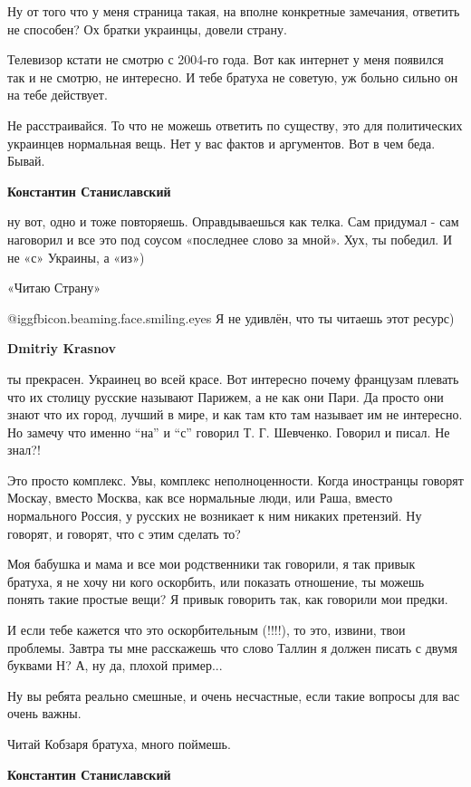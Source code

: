 \begin{itemize}
\begin{itemize}
Ну от того что у меня страница такая, на вполне конкретные замечания, ответить
не способен? Ох братки украинцы, довели страну.

Телевизор кстати не смотрю с 2004-го года. Вот как интернет у меня появился так
и не смотрю, не интересно. И тебе братуха не советую, уж больно сильно он на
тебе действует.

Не расстраивайся. То что не можешь ответить по существу, это для политических
украинцев нормальная вещь. Нет у вас фактов и аргументов. Вот в чем беда.
Бывай.

\textbf{Константин Станиславский} 

ну вот, одно и тоже повторяешь. Оправдываешься как телка. Сам придумал - сам
наговорил и все это под соусом «последнее слово за мной». Хух, ты победил. И не
«с» Украины, а «из»)

«Читаю Страну»

 @igg{fbicon.beaming.face.smiling.eyes} Я не удивлён, что ты читаешь этот ресурс)


\textbf{Dmitriy Krasnov} 

ты прекрасен. Украинец во всей красе. Вот интересно почему французам плевать
что их столицу русские называют Парижем, а не как они Пари. Да просто они знают
что их город, лучший в мире, и как там кто там называет им не интересно. Но
замечу что именно \enquote{на} и \enquote{с} говорил Т. Г. Шевченко. Говорил и писал. Не знал?!

Это просто комплекс. Увы, комплекс неполноценности. Когда иностранцы говорят
Москау, вместо Москва, как все нормальные люди, или Раша, вместо нормального
Россия, у русских не возникает к ним никаких претензий. Ну говорят, и говорят,
что с этим сделать то?

Моя бабушка и мама и все мои родственники так говорили, я так привык братуха, я
не хочу ни кого оскорбить, или показать отношение, ты можешь понять такие
простые вещи? Я привык говорить так, как говорили мои предки.

И если тебе кажется что это оскорбительным (!!!!), то это, извини, твои
проблемы. Завтра ты мне расскажешь что слово Таллин я должен писать с двумя
буквами Н? А, ну да, плохой пример...

Ну вы ребята реально смешные, и очень несчастные, если такие вопросы для вас
очень важны.

Читай Кобзаря братуха, много поймешь.

\textbf{Константин Станиславский} 


\end{itemize}
\end{itemize}
